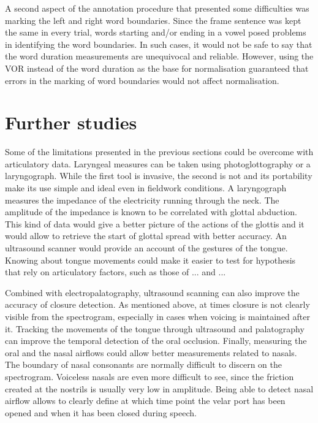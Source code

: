 \documentclass[11pt,a4paper,openany]{memoir}\usepackage[]{graphicx}\usepackage[]{color}
\begin{document}
A second aspect of the annotation procedure that presented some difficulties was marking the left and right word boundaries.
Since the frame sentence was kept the same in every trial, words starting and/or ending in a vowel posed problems in identifying the word boundaries.
In such cases, it would not be safe to say that the word duration measurements are unequivocal and reliable.
However, using the VOR instead of the word duration as the base for normalisation guaranteed that errors in the marking of word boundaries would not affect normalisation.

\section{Further studies}

Some of the limitations presented in the previous sections could be overcome with articulatory data.
Laryngeal measures can be taken using photoglottography or a laryngograph.
While the first tool is invasive, the second is not and its portability make its use simple and ideal even in fieldwork conditions.
A laryngograph measures the impedance of the electricity running through the neck.
The amplitude of the impedance is known to be correlated with glottal abduction.
This kind of data would give a better picture of the actions of the glottis and it would allow to retrieve the start of glottal spread with better accuracy.
An ultrasound scanner would provide an account of the gestures of the tongue.
Knowing about tongue movements could make it easier to test for hypothesis that rely on articulatory factors, such as those of ... and ...

Combined with electropalatography, ultrasound scanning can also improve the accuracy of closure detection.
As mentioned above, at times closure is not clearly visible from the spectrogram, especially in cases when voicing is maintained after it.
Tracking the movements of the tongue through ultrasound and palatography can improve the temporal detection of the oral occlusion.
Finally, measuring the oral and the nasal airflows could allow better measurements related to nasals.
The boundary of nasal consonants are normally difficult to discern on the spectrogram.
Voiceless nasals are even more difficult to see, since the friction created at the nostrils is usually very low in amplitude.
Being able to detect nasal airflow allows to clearly define at which time point the velar port has been opened and when it has been closed during speech.
















%





\appendix








\end{document}
